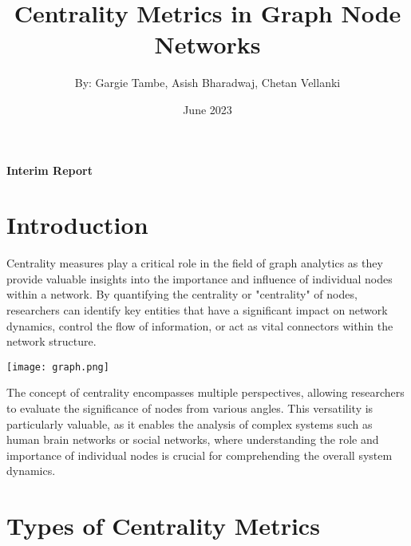 \documentclass{article}
\title{\textbf{Centrality Metrics in Graph Node Networks}}
\author{By: Gargie Tambe, Asish Bharadwaj, Chetan Vellanki}
\date{June 2023}
\begin{document}
\maketitle

\begin{center}
    \Large \textbf{Interim Report}
\end{center}

\section*{Introduction}
Centrality measures play a critical role in the field of graph analytics as they provide valuable insights into the importance and influence of individual nodes within a network. By quantifying the centrality or "centrality" of nodes, researchers can identify key entities that have a significant impact on network dynamics, control the flow of information, or act as vital connectors within the network structure.

\begin{center}
    \texttt{[image: graph.png]}  
\end{center}

The concept of centrality encompasses multiple perspectives, allowing researchers to evaluate the significance of nodes from various angles. This versatility is particularly valuable, as it enables the analysis of complex systems such as human brain networks or social networks, where understanding the role and importance of individual nodes is crucial for comprehending the overall system dynamics.

\section*{Types of Centrality Metrics}
\end{document}
